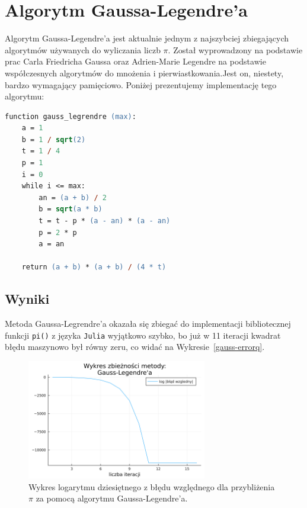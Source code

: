 \section{Algorytm Gaussa-Legendre'a}

Algorytm Gaussa-Legendre'a jest aktualnie jednym z najszybciej zbiegających algorytmów używanych do wyliczania liczb $\pi$. Został wyprowadzony na podstawie prac Carla Friedricha Gaussa oraz Adrien-Marie Legendre na podstawie współczesnych algorytmów do mnożenia i pierwiastkowania.Jest on, niestety, bardzo wymagający pamięciowo. Poniżej prezentujemy implementację tego algorytmu\cite{gausse2}:

\begin{lstlisting}[language=ps]
function gauss_legrendre (max):
    a = 1
    b = 1 / sqrt(2)
    t = 1 / 4
    p = 1
    i = 0
    while i <= max:
        an = (a + b) / 2
        b = sqrt(a * b)
        t = t - p * (a - an) * (a - an)
        p = 2 * p
        a = an
    
    return (a + b) * (a + b) / (4 * t)
\end{lstlisting}

\subsection{Wyniki}

Metoda Gaussa-Legrendre'a okazała się zbiegać do implementacji bibliotecznej funkcji \verb+pi()+ z języka \verb+Julia+ wyjątkowo szybko, bo już w 11 iteracji kwadrat błędu maszynowo był równy zeru, co widać na Wykresie~\ref{gauss-errorq}.

\begin{figure}[!h]
    \centering
    \renewcommand{\figurename}{Wykres}
    \includegraphics[width=0.7\textwidth]{../prog/gauss_legendre_log_error.png}
    \caption{Wykres logarytmu dziesiętnego z błędu względnego dla przybliżenia $\pi$ za pomocą algorytmu Gaussa-Legendre'a.}
    \label{gauss-error}
\end{figure}

